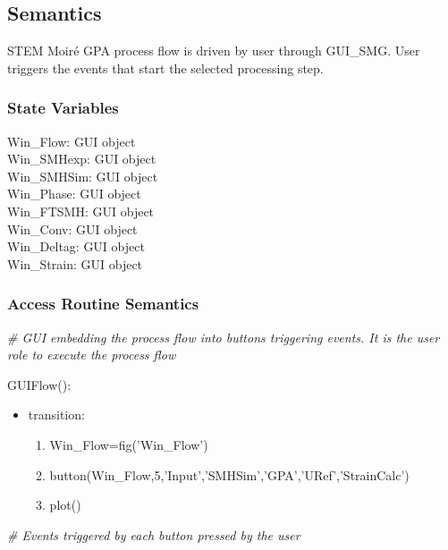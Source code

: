 \documentclass[12pt, titlepage]{article}
\newcommand{\progname}{STEM Moir{\'e} GPA}
\begin{document}
\subsection{Semantics}

\progname{} process flow is driven by user through GUI{\_}SMG. User triggers the events that start the selected processing step. 

\subsubsection{State Variables}

\noindent Win{\_}Flow: GUI object\\
Win{\_}SMHexp: GUI object\\
Win{\_}SMHSim: GUI object\\
Win{\_}Phase: GUI object\\
Win{\_}FTSMH: GUI object\\
Win{\_}Conv: GUI object\\
Win{\_}Deltag: GUI object\\
Win{\_}Strain: GUI object\\


\subsubsection{Access Routine Semantics}

\noindent\textit{{\#} GUI embedding the process flow into buttons triggering events. It is the user role to execute the process flow}\medskip

\noindent GUIFlow():
\begin{itemize}
\item transition: 
	\begin{enumerate}
	\item Win{\_}Flow=fig('Win{\_}Flow') 
	\item button(Win{\_}Flow,5,'Input','SMHSim','GPA','URef','StrainCalc') 
	\item plot()
	\end{enumerate} 
\end{itemize}
\bigskip

\noindent\textit{{\#} Events triggered by each button pressed by the user}\medskip
\end{document}

